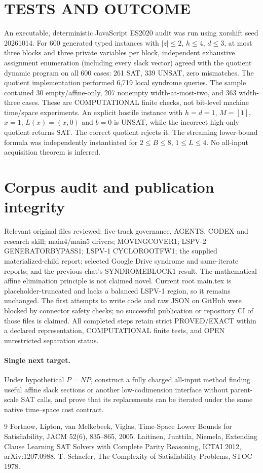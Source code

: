 \documentclass[11pt]{article}
\begin{document}
\section{TESTS AND OUTCOME}
An executable, deterministic JavaScript ES2020 audit was run
using xorshift seed 20261014. For 600 generated typed instances
with $|z|\le2$, $h\le4$, $d\le3$, at most three blocks and three
private variables per block, independent exhaustive assignment
enumeration (including every slack vector) agreed with the
quotient dynamic program on all 600 cases: 261 SAT, 339 UNSAT,
zero mismatches. The quotient implementation performed 6,719
local syndrome queries. The sample contained 30 empty/affine-only,
207 nonempty width-at-most-two, and 363 width-three cases.
These are COMPUTATIONAL finite checks, not bit-level machine
time/space experiments. An explicit hostile instance with
$h=d=1$, $M=[1]$, $x=1$, $L(x)=(x,0)$ and $b=0$
is UNSAT, while the incorrect high-only quotient returns SAT.
The correct quotient rejects it. The streaming lower-bound
formula was independently instantiated for $2\le B\le8$,
$1\le L\le4$. No all-input acquisition theorem is inferred.
\section{Corpus audit and publication integrity}
Relevant original files reviewed: five-track governance,
AGENTS, CODEX and research skill; main4/main5 drivers;
MOVINGCOVER1; LSPV-2 GENERATORBYPASS1; LSPV-1
CYCLOROOTFW1; the supplied materialized-child report;
selected Google Drive syndrome and same-iterate reports;
and the previous chat's SYNDROMEBLOCK1 result.
The mathematical affine elimination principle is not claimed
novel. Current root main.tex is placeholder-truncated and
lacks a balanced LSPV-1 region, so it remains unchanged.
The first attempts to write code and raw JSON on GitHub
were blocked by connector safety checks; no successful
publication or repository CI of those files is claimed.
All completed steps retain strict PROVED/EXACT within
a declared representation, COMPUTATIONAL finite tests,
and OPEN unrestricted separation status.
\paragraph{Single next target.}
Under hypothetical $P=NP$, construct a fully charged
all-input method finding useful affine slack sections or
another low-codimension interface without parent-scale SAT
calls, and prove that its replacements can be iterated
under the same native time--space cost contract.
\begin{thebibliography}{9}\small
{} Fortnow, Lipton, van Melkebeek, Viglas,
Time-Space Lower Bounds for Satisfiability,
JACM 52(6), 835--865, 2005.
 Laitinen, Junttila, Niemela,
Extending Clause Learning SAT Solvers with Complete Parity
Reasoning, ICTAI 2012, arXiv:1207.0988.
 T. Schaefer,
The Complexity of Satisfiability Problems, STOC 1978.
\end{thebibliography}
\end{document}
